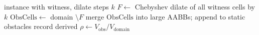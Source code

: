 \begin{algorithm}[t]
\caption{\textsc{CorridorRack}: complement of dilated witnesses}
\label{alg:rack}
\begin{algorithmic}[1]
\Require instance with witness, dilate steps $k$
\State $F \gets$ Chebyshev dilate of all witness cells by $k$
\State $\mathrm{ObsCells} \gets$ domain $\setminus F$
\State merge $\mathrm{ObsCells}$ into large AABBs; append to static obstacles
\State record derived $\rho \gets V_{\mathrm{obs}} / V_{\mathrm{domain}}$
\end{algorithmic}
\end{algorithm}
